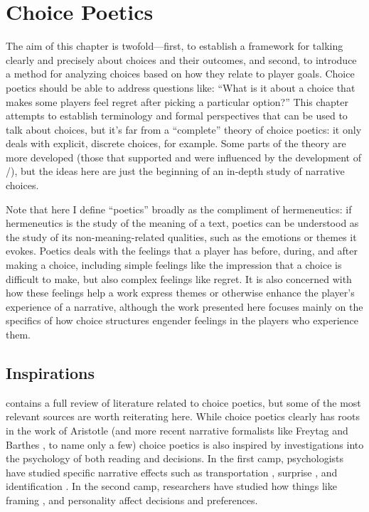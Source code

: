 \chapter{Choice Poetics}

\label{ch:choice-poetics}


The aim of this chapter is twofold---first, to establish a framework for talking clearly and precisely about choices and their outcomes, and second, to introduce a method for analyzing choices based on how they relate to player goals.
%
Choice poetics should be able to address questions like: ``What is it about a choice that makes some players feel regret after picking a particular option?''
%
This chapter attempts to establish terminology and formal perspectives that can be used to talk about choices, but it's far from a ``complete'' theory of choice poetics: it only deals with explicit, discrete choices, for example.
%
Some parts of the theory are more developed (those that supported and were influenced by the development of \dunyazad/), but the ideas here are just the beginning of an in-depth study of narrative choices.


Note that here I define ``poetics'' broadly as the compliment of hermeneutics: if hermeneutics is the study of the meaning of a text, poetics can be understood as the study of its non-meaning-related qualities, such as the emotions or themes it evokes.
%
Poetics deals with the feelings that a player has before, during, and after making a choice, including simple feelings like the impression that a choice is difficult to make, but also complex feelings like regret.
%
It is also concerned with how these feelings help a work express themes or otherwise enhance the player's experience of a narrative, although the work presented here focuses mainly on the specifics of how choice structures engender feelings in the players who experience them.


\section{Inspirations}

 contains a full review of literature related to choice poetics, but some of the most relevant sources are worth reiterating here.
%
While choice poetics clearly has roots in the work of Aristotle \citep{Aristotle1917} (and more recent narrative formalists like Freytag \citep{Freytag1894} and Barthes \citep{Barthes1975}, to name only a few) choice poetics is also inspired by investigations into the psychology of both reading and decisions.
%
In the first camp, psychologists have studied specific narrative effects such as transportation \citep{Green2000}, surprise \citep{Iran-Nejad1987}, and identification \citep{Oatley1995}.
%
In the second camp, researchers have studied how things like framing \citep{Tversky1981,Tversky1993}, and personality \citep{Schwartz2002} affect decisions and preferences.


